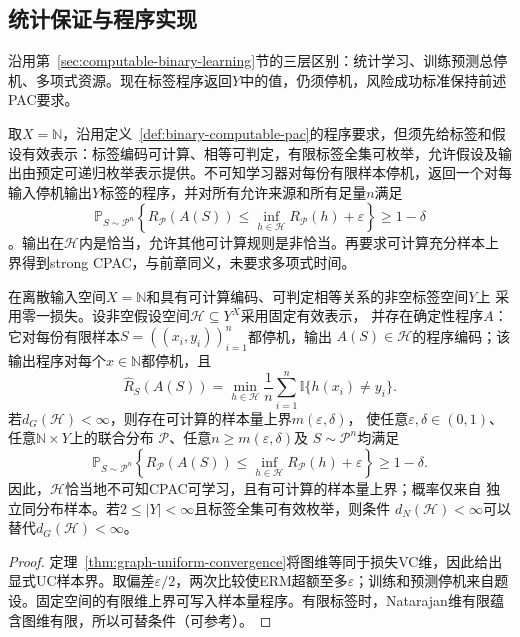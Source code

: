 \subsection{统计保证与程序实现}

沿用第~\ref{sec:computable-binary-learning}节的三层区别：统计学习、训练预测总停机、多项式资源。现在标签程序返回$Y$中的值，仍须停机，风险成功标准保持前述PAC要求。

取$X=\mathbb N$，沿用定义~\ref{def:binary-computable-pac}的程序要求，但须先给标签和假设有效表示：标签编码可计算、相等可判定，有限标签全集可枚举，允许假设及输出由预定可递归枚举表示提供。不可知学习器对每份有限样本停机，返回一个对每输入停机输出$Y$标签的程序，并对所有允许来源和所有足量$n$满足
\[
 \mathbb P_{S\sim\mathcal P^n}\!\left\{
 R_{\mathcal P}(A(S))\leq\inf_{h\in\mathcal H}R_{\mathcal P}(h)+\varepsilon
 \right\}\geq1-\delta
\]
。输出在$\mathcal H$内是恰当，允许其他可计算规则是非恰当。再要求可计算充分样本上界得到strong CPAC，与前章同义，未要求多项式时间。

\begin{theorem}[多分类可计算ERM的充分条件]
\label{thm:multiclass-computable-erm}
在离散输入空间$X=\mathbb N$和具有可计算编码、可判定相等关系的非空标签空间$Y$上
采用零一损失。设非空假设空间$\mathcal H\subseteq Y^X$采用固定有效表示，
并存在确定性程序$A$：它对每份有限样本$S=((x_i,y_i))_{i=1}^n$都停机，输出
$A(S)\in\mathcal H$的程序编码；该输出程序对每个$x\in\mathbb N$都停机，且
\[
 \hat R_S(A(S))
 =\min_{h\in\mathcal H}\frac1n\sum_{i=1}^n\mathbb I\{h(x_i)\neq y_i\}.
\]
若$d_G(\mathcal H)<\infty$，则存在可计算的样本量上界$m(\varepsilon,\delta)$，
使任意$\varepsilon,\delta\in(0,1)$、任意$\mathbb N\times Y$上的联合分布
$\mathcal P$、任意$n\geq m(\varepsilon,\delta)$及
$S\sim\mathcal P^n$均满足
\[
 \mathbb P_{S\sim\mathcal P^n}\left\{
 R_{\mathcal P}(A(S))
 \leq\inf_{h\in\mathcal H}R_{\mathcal P}(h)+\varepsilon
 \right\}\geq1-\delta.
\]
因此，$\mathcal H$恰当地不可知CPAC可学习，且有可计算的样本量上界；概率仅来自
独立同分布样本。若$2\leq|Y|<\infty$且标签全集可有效枚举，则条件
$d_N(\mathcal H)<\infty$可以替代$d_G(\mathcal H)<\infty$。
\end{theorem}

\begin{proof}
定理~\ref{thm:graph-uniform-convergence}将图维等同于损失VC维，因此给出显式UC样本界。取偏差$\varepsilon/2$，两次比较使ERM超额至多$\varepsilon$；训练和预测停机来自题设。固定空间的有限维上界可写入样本量程序。有限标签时，Natarajan维有限蕴含图维有限，所以可替条件（可参考）。
\end{proof}


